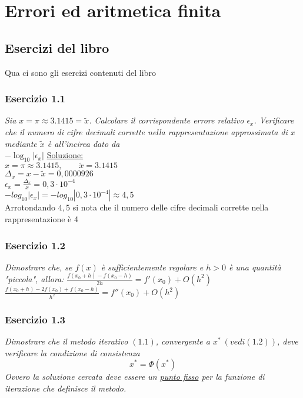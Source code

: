 \chapter{Errori ed aritmetica finita}
\section{Esercizi del libro}
Qua ci sono gli esercizi contenuti del libro
\subsection{Esercizio 1.1}
\emph{Sia $ x = \pi \approx 3.1415 = \tilde{x} $. Calcolare il corrispondente errore relativo $\epsilon_{x}$.
Verificare che il numero di cifre decimali corrette nella rappresentazione approssimata di x mediante $\tilde{x}$ è all'incirca dato da}  \\

\center$-\log_{10}|\epsilon_{x}|$
\flushleft \underline{Soluzione:}\\
\center
$ x = \pi \approx 3.1415, \qquad \tilde{x} = 3.1415 $ \\ \vspace{1ex}
$ \Delta_{x} = x - \tilde{x} = 0,0000926$ \\ \vspace{1ex}
$ \epsilon_{x} = \frac{\Delta_{x}}{x} = 0,3 \cdot 10^{-4} $\\ \vspace{1ex}
$ -log_{10} | \epsilon_{x} | = -log_{10} | 0,3 \cdot 10^{-4} | \approx 4,5  $\\ \vspace{1ex}
\flushleft Arrotondando $ 4,5 $ si nota che il numero delle cifre decimali corrette nella rappresentazione è 4

\subsection{Esercizio 1.2}
\emph{Dimostrare che, se $f(x)$ è sufficientemente regolare e $ h> 0 $ è una quantità "piccola", allora:}
\center$\frac{f(x_{0}+h)-f(x_{0}-h)}{2h} = f'(x_{0})+O(h^2)$ \\
\vspace{1em}
$\frac{f(x_{0}+h)-2f(x_{0})+f(x_{0}-h)}{h^2} = f''(x_{0})+O(h^2) $
\flushleft

\subsection{Esercizio 1.3}
\emph{Dimostrare che il metodo iterativo $(1.1) $, convergente a $ x^* \ (vedi(1.2)) $, deve verificare la condizione di consistenza}
$$ x^* =  \Phi(x^*)$$
\emph{Ovvero la soluzione cercata deve essere un \underline{punto fisso} per la funzione di iterazione che definisce il metodo.}

